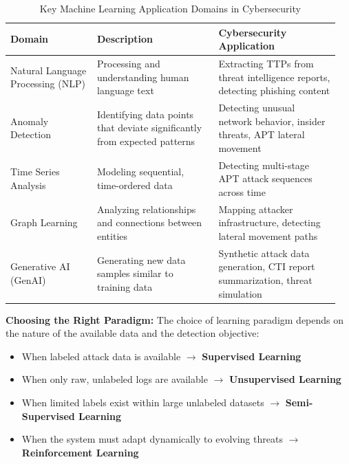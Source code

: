 \begin{table}[h]
\centering
\caption{Key Machine Learning Application Domains in Cybersecurity}
\label{tab:ml_domains}
\begin{tabular}{|p{0.25\linewidth}|p{0.35\linewidth}|p{0.35\linewidth}|}
\hline
\textbf{Domain} & \textbf{Description} & \textbf{Cybersecurity Application} \\ \hline
Natural Language Processing (NLP) & Processing and understanding human language text & Extracting TTPs from threat intelligence reports, detecting phishing content \\ \hline
Anomaly Detection & Identifying data points that deviate significantly from expected patterns & Detecting unusual network behavior, insider threats, APT lateral movement \\ \hline
Time Series Analysis & Modeling sequential, time-ordered data & Detecting multi-stage APT attack sequences across time \\ \hline
Graph Learning & Analyzing relationships and connections between entities & Mapping attacker infrastructure, detecting lateral movement paths \\ \hline
Generative AI (GenAI) & Generating new data samples similar to training data & Synthetic attack data generation, CTI report summarization, threat simulation \\ \hline
\end{tabular}

\end{table}

\textbf{Choosing the Right Paradigm:}
The choice of learning paradigm depends on the nature of the available data and the detection objective:
\begin{itemize}
    \item When labeled attack data is available $\rightarrow$ \textbf{Supervised Learning}
    \item When only raw, unlabeled logs are available $\rightarrow$ \textbf{Unsupervised Learning}
    \item When limited labels exist within large unlabeled datasets $\rightarrow$ \textbf{Semi-Supervised Learning}
    \item When the system must adapt dynamically to evolving threats $\rightarrow$ \textbf{Reinforcement Learning}
\end{itemize}


\clearpage

